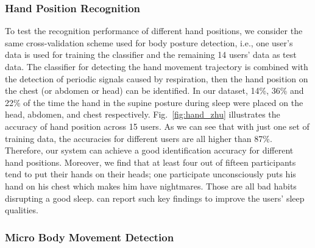 \subsubsection{Hand Position Recognition}
To test the recognition performance of different hand positions, we consider the same cross-validation scheme used for body posture
detection, i.e., one user's data is used for training the classifier and the remaining 14 users' data as test data. The classifier for
detecting the hand movement trajectory is combined with the detection of periodic signals caused by respiration, then the hand position on
the chest (or abdomen or head) can be identified. In our dataset, 14\%, 36\% and 22\% of the time the hand in the supine posture during
sleep were placed on the head, abdomen, and chest respectively. Fig.~\ref{fig:hand_zhu} illustrates the accuracy of hand position across 15
users. As we can see that with just one set of training data, the accuracies for different users are all higher than 87\%. Therefore, our
system can achieve a good identification accuracy for different hand positions. Moreover, we find that at least four out of fifteen
participants tend to put their hands on their heads; one participate unconsciously puts his hand on his chest which makes him have
nightmares. Those are all bad habits disrupting a good sleep. {\systemname} can report such key findings to improve the users' sleep
qualities.


\subsubsection{Micro Body Movement Detection}

